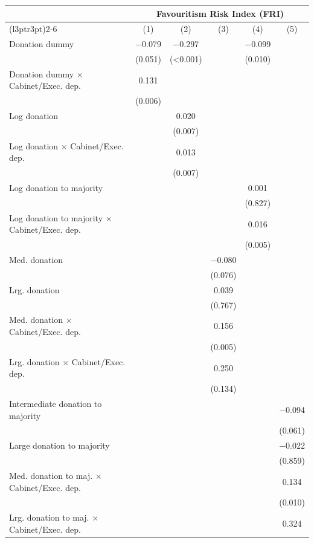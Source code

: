 
\begin{tabular}[t]{lccccc}
\toprule
\multicolumn{1}{c}{ } & \multicolumn{5}{c}{Favouritism Risk Index (FRI)} \\
\cmidrule(l{3pt}r{3pt}){2-6}
  & (1) & (2) & (3) & (4) & (5)\\
\midrule
Donation dummy & \num{-0.079} & \num{-0.297} &  & \num{-0.099} & \\
 & (\num{0.051}) & (\num{<0.001}) &  & (\num{0.010}) & \\
Donation dummy $\times$ Cabinet/Exec. dep. & \num{0.131} &  &  &  & \\
 & (\num{0.006}) &  &  &  & \\
Log donation &  & \num{0.020} &  &  & \\
 &  & (\num{0.007}) &  &  \vphantom{1} & \\
Log donation $\times$ Cabinet/Exec. dep. &  & \num{0.013} &  &  & \\
 &  & (\num{0.007}) &  &  & \\
Log donation to majority &  &  &  & \num{0.001} & \\
 &  &  &  & (\num{0.827}) & \\
Log donation to majority $\times$ Cabinet/Exec. dep. &  &  &  & \num{0.016} & \\
 &  &  &  & (\num{0.005}) & \\
Med. donation &  &  & \num{-0.080} &  & \\
 &  &  & (\num{0.076}) &  & \\
Lrg. donation &  &  & \num{0.039} &  & \\
 &  &  & (\num{0.767}) &  & \\
Med. donation $\times$ Cabinet/Exec. dep. &  &  & \num{0.156} &  & \\
 &  &  & (\num{0.005}) &  & \\
Lrg. donation $\times$ Cabinet/Exec. dep. &  &  & \num{0.250} &  & \\
 &  &  & (\num{0.134}) &  & \\
Intermediate donation to majority &  &  &  &  & \num{-0.094}\\
 &  &  &  &  & (\num{0.061})\\
Large donation to majority &  &  &  &  & \num{-0.022}\\
 &  &  &  &  & (\num{0.859})\\
Med. donation to maj. $\times$ Cabinet/Exec. dep. &  &  &  &  & \num{0.134}\\
 &  &  &  &  & (\num{0.010})\\
Lrg. donation to maj. $\times$ Cabinet/Exec. dep. &  &  &  &  & \num{0.324}\\

\end{tabular}
